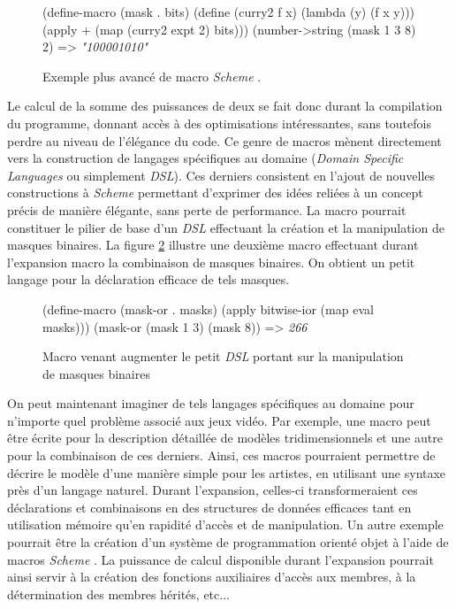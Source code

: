\documentclass[12pt,twoside,letterpaper,francais]{book}
\newcommand{\Schemelang}{{\textit{Scheme }}}
\newcommand{\scheme}[1]{\selectlanguage{english}{\tt #1}\selectlanguage{french}}
\newcommand{\schemeresult}[1]{{\it #1}}
\begin{document}
\begin{figure}[htb!]
  \begin{schemecode}
(define-macro (mask . bits)
  (define (curry2 f x) (lambda (y) (f x y)))
  (apply + (map (curry2 expt 2) bits)))
(number->string (mask 1 3 8) 2) => \schemeresult{"100001010"}
  \end{schemecode}
  \caption{Exemple plus avancé de macro \Schemelang.}
  \label{Scheme:macro-ex1}
\end{figure}

Le calcul de la somme des puissances de deux se fait donc durant la
compilation du programme, donnant accès à des optimisations
intéressantes, sans toutefois perdre au niveau de l'élégance du
code. Ce genre de macros mènent directement vers la construction de
langages spécifiques au domaine (\textit{Domain Specific Languages} ou
simplement \textit{DSL}). Ces derniers consistent en l'ajout de
nouvelles constructions à \Schemelang permettant d'exprimer des idées
reliées à un concept précis de manière élégante, sans perte de
performance. La macro \scheme{mask} pourrait constituer le pilier de
base d'un \textit{DSL} effectuant la création et la manipulation de
masques binaires. La figure \ref{Scheme:macro-mini-dsl} illustre une
deuxième macro effectuant durant l'expansion macro la combinaison de
masques binaires. On obtient un petit langage pour la déclaration
efficace de tels masques.\\

\begin{figure}[htb!]
  \begin{schemecode}
(define-macro (mask-or . masks)
  (apply bitwise-ior (map eval masks)))
(mask-or (mask 1 3) (mask 8)) => \schemeresult{266}
  \end{schemecode}
  \caption{Macro venant augmenter le petit \textit{DSL} portant sur la
    manipulation de masques binaires}
  \label{Scheme:macro-mini-dsl}
\end{figure}

On peut maintenant imaginer de tels langages spécifiques au domaine
pour n'importe quel problème associé aux jeux vidéo. Par exemple, une
macro peut être écrite pour la description détaillée de modèles
tridimensionnels et une autre pour la combinaison de ces
derniers. Ainsi, ces macros pourraient permettre de décrire le modèle
d'une manière simple pour les artistes, en utilisant une syntaxe près
d'un langage naturel. Durant l'expansion, celles-ci transformeraient
ces déclarations et combinaisons en des structures de données
efficaces tant en utilisation mémoire qu'en rapidité d'accès et de
manipulation. Un autre exemple pourrait être la création d'un système
de programmation orienté objet à l'aide de macros \Schemelang. La
puissance de calcul disponible durant l'expansion pourrait ainsi
servir à la création des fonctions auxiliaires d'accès aux membres, à
la détermination des membres hérités, etc...
\end{document}
